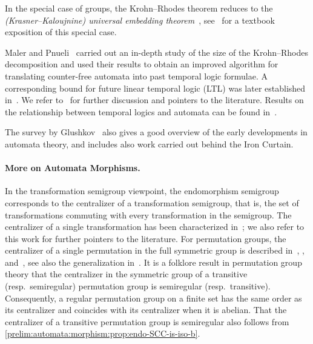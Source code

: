 In the special case of groups, the Krohn–Rhodes theorem reduces to the \emph{(Krasner–Kaloujnine) universal embedding theorem}~\cite{KK513}, see~\cite[Sect.~2.6]{dixon1996permutation} for a textbook exposition of this special case.

Maler and Pnueli~\cite{DBLP:conf/focs/MalerP90} carried out an in-depth study of the size of the Krohn--Rhodes decomposition and used their results to obtain an improved algorithm for translating counter-free automata into past temporal logic formulae. A corresponding bound for future linear temporal logic (LTL) was later established in~\cite{DBLP:conf/fossacs/BokerLS22}. We refer to~\cite{DBLP:conf/birthday/Maler10,MalerPnueli94} for further discussion and pointers to the literature. Results on the relationship between temporal logics and automata can be found in~\cite{DBLP:journals/jcss/CohenPP93}.

The survey by Glushkov~\cite{Glu61} also gives a good overview of the early developments in automata theory, and includes also work carried out behind the Iron Curtain.

\paragraph{More on Automata Morphisms.} 
In the transformation semigroup viewpoint, the endomorphism semigroup corresponds to the centralizer of a transformation semigroup, that is, the set of transformations commuting with every transformation in the semigroup. The centralizer of a single transformation has been characterized in~\cite{AraujoKonieczny2013_CentralizersFullTransformation}; we also refer to this work for further pointers to the literature. For permutation groups, the centralizer of a single permutation in the full symmetric group is described in~\cite[pp.~295]{suzuki1982group}, \cite[Thm.~15.2]{Wells1976_ApplicationsWreath}, and~\cite{KezlanRhee99}, see also the generalization in~\cite{Lipscomb1988_CentralizerPermutation}. 
It is a folklore result in permutation group theory that the centralizer in the symmetric group of a transitive (resp.~semiregular) permutation group is semiregular (resp.~transitive). Consequently, a regular permutation group on a finite set has the same order as its centralizer and coincides with its centralizer when it is abelian. That the centralizer of a transitive permutation group is semiregular also follows from \cref{prelim:automata:morphism:prop:endo-SCC-is-iso-b}.

